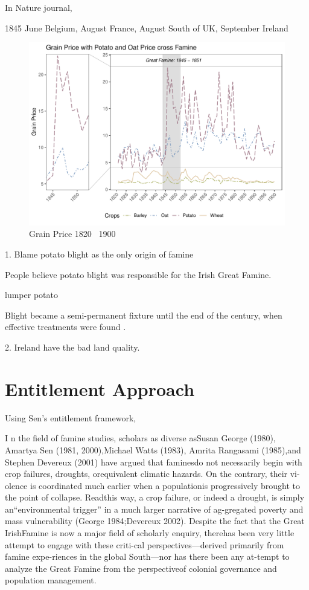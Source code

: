 In Nature journal,

1845 June Belgium, August France, August South of UK, September Ireland

\begin{figure}[htbp]
    \centering
    \caption{Grain Price 1820 \textendash\ 1900}
    \includegraphics[width=.95\textwidth]{../03_outputs/grain_price.pdf}
\end{figure}



1. Blame potato blight as the only origin of famine

People believe potato blight was responsible for the Irish Great Famine. 

lumper potato

Blight became a semi-permanent fixture until the end of the century, when effective treatments were found \citep{o1994economic}.

2. Ireland have the bad land quality.

\section{Entitlement Approach}

Using Sen's entitlement framework, \citep{fraser2003social}

I n the ﬁeld of famine studies, scholars as diverse asSusan George (1980), Amartya Sen (1981, 2000),Michael Watts (1983), Amrita Rangasami (1985),and Stephen Devereux (2001) have argued that faminesdo not necessarily begin with crop failures, droughts, orequivalent climatic hazards. On the contrary, their vi-olence is coordinated much earlier when a populationis progressively brought to the point of collapse. Readthis way, a crop failure, or indeed a drought, is simply an“environmental trigger” in a much larger narrative of ag-gregated poverty and mass vulnerability (George 1984;Devereux 2002). Despite the fact that the Great IrishFamine is now a major ﬁeld of scholarly enquiry, therehas been very little attempt to engage with these criti-cal perspectives—derived primarily from famine expe-riences in the global South—nor has there been any at-tempt to analyze the Great Famine from the perspectiveof colonial governance and population management. \citep{nally2008coming}


